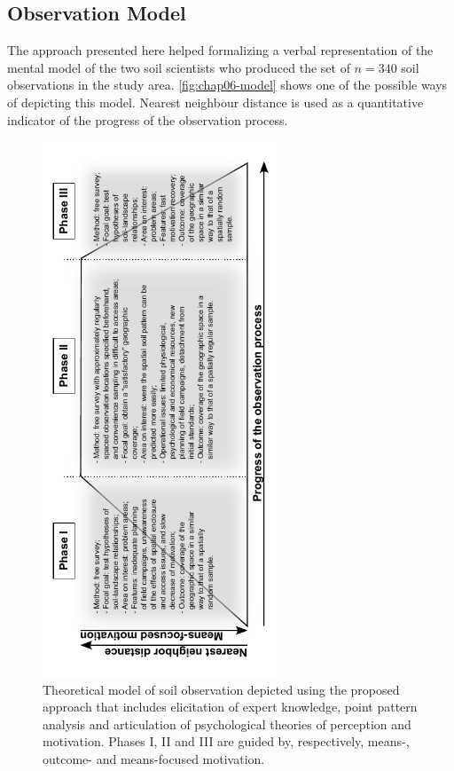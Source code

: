 \subsection{Observation Model}

The approach presented here helped formalizing a verbal representation of the mental model of the two soil 
scientists who produced the set of $n = 340$ soil observations in the study area. \autoref{fig:chap06-model} 
shows one of the possible ways of depicting this model. Nearest neighbour distance is 
used as a quantitative indicator of the progress of the observation process.

\begin{figure}[!h]
 \centering
 \includegraphics[width=7cm,angle=-90]{fig/chap06-observation-model}
 \caption{Theoretical model of soil observation depicted using the proposed approach that includes elicitation 
 of expert knowledge, point pattern analysis and articulation of psychological theories of perception and 
 motivation. Phases I, II and III are guided by, respectively, means-, outcome- and means-focused motivation.}
 \label{fig:chap06-model}
\end{figure}


